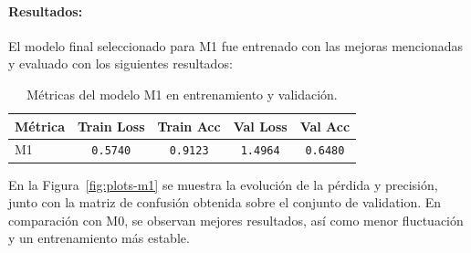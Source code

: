 \documentclass[11pt]{article}
\begin{document}
\paragraph{Resultados:}

El modelo final seleccionado para M1 fue entrenado con las mejoras mencionadas y evaluado con los siguientes resultados:

\begin{table}[H]
    \centering
    \begin{tabular}{lcccc}
        \hline
        Métrica & Train Loss & Train Acc & Val Loss & Val Acc \\
        \hline
        M1 & \texttt{0.5740} & \texttt{0.9123} & \texttt{1.4964} & \texttt{0.6480} \\
        \hline
    \end{tabular}
    \caption{Métricas del modelo M1 en entrenamiento y validación.}
    \label{tab:metrics-m1}
\end{table}

En la Figura~\ref{fig:plots-m1} se muestra la evolución de la pérdida y precisión, junto con la matriz de confusión obtenida sobre el conjunto de validation. En comparación con M0, se observan mejores resultados, así como menor fluctuación y un entrenamiento más estable.
\end{document}
